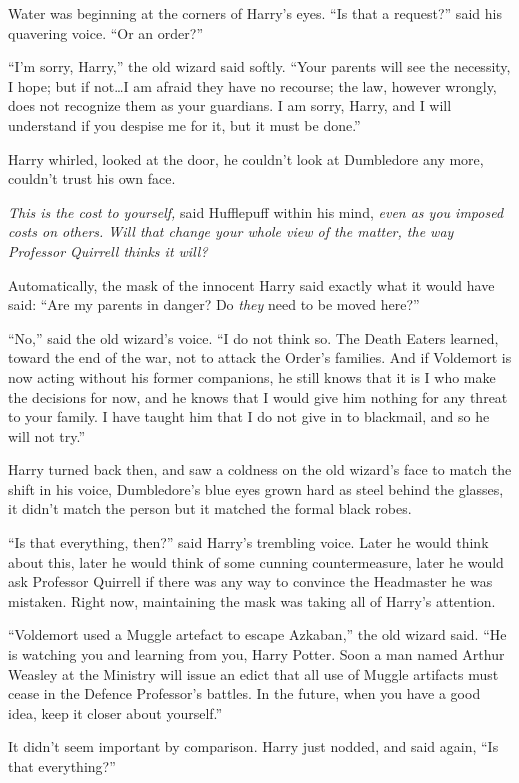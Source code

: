Water was beginning at the corners of Harry’s eyes. “Is that a request?” said his quavering voice. “Or an order?”

“I’m sorry, Harry,” the old wizard said softly. “Your parents will see the necessity, I hope; but if not…I am afraid they have no recourse; the law, however wrongly, does not recognize them as your guardians. I am sorry, Harry, and I will understand if you despise me for it, but it must be done.”

Harry whirled, looked at the door, he couldn’t look at Dumbledore any more, couldn’t trust his own face.

\emph{This is the cost to yourself,} said Hufflepuff within his mind, \emph{even as you imposed costs on others. Will that change your whole view of the matter, the way Professor Quirrell thinks it will?}

Automatically, the mask of the innocent Harry said exactly what it would have said: “Are my parents in danger? Do \emph{they} need to be moved here?”

“No,” said the old wizard’s voice. “I do not think so. The Death Eaters learned, toward the end of the war, not to attack the Order’s families. And if Voldemort is now acting without his former companions, he still knows that it is I who make the decisions for now, and he knows that I would give him nothing for any threat to your family. I have taught him that I do not give in to blackmail, and so he will not try.”

Harry turned back then, and saw a coldness on the old wizard’s face to match the shift in his voice, Dumbledore’s blue eyes grown hard as steel behind the glasses, it didn’t match the person but it matched the formal black robes.

“Is that everything, then?” said Harry’s trembling voice. Later he would think about this, later he would think of some cunning countermeasure, later he would ask Professor Quirrell if there was any way to convince the Headmaster he was mistaken. Right now, maintaining the mask was taking all of Harry’s attention.

“Voldemort used a Muggle artefact to escape Azkaban,” the old wizard said. “He is watching you and learning from you, Harry Potter. Soon a man named Arthur Weasley at the Ministry will issue an edict that all use of Muggle artifacts must cease in the Defence Professor’s battles. In the future, when you have a good idea, keep it closer about yourself.”

It didn’t seem important by comparison. Harry just nodded, and said again, “Is that everything?”

